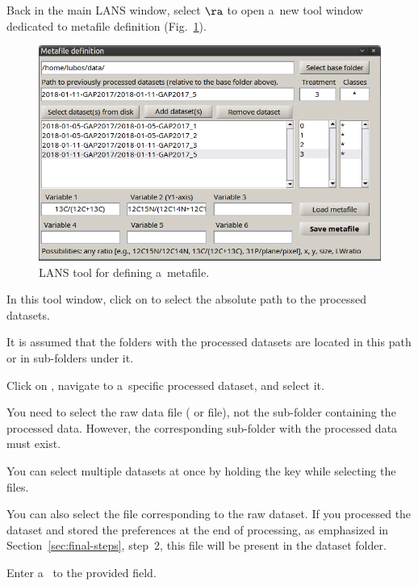 \s Back in the main LANS window, select  $\ra$  to open a~new tool window dedicated to metafile definition (Fig.~\ref{fig:metafile-definition}). 

\begin{figure}[!ht]
\centering
\includegraphics[scale=0.4]{figs3/LANS-metafile-definition}
\caption{\label{fig:metafile-definition}%
LANS tool for defining a~metafile.}
\end{figure}

\s In this tool window, click on  to select the absolute path to the processed datasets.

\nb
\bul It is assumed that the folders with the processed datasets are located in this path or in sub-folders under it.

\s Click on , navigate to a~specific processed dataset, and select it.

\nb
\bul You need to select the raw data file ( or  file), not the sub-folder containing the processed data. However, the corresponding sub-folder with the processed data must exist.

\bul You can select multiple datasets at once by holding the  key while selecting the files.

\bul You can also select the  file corresponding to the raw dataset. If you processed the dataset and stored the preferences at the end of processing, as emphasized in Section~\ref{sec:final-steps}, step~2, this file will be present in the dataset folder.

\s Enter a~ to the provided field.

